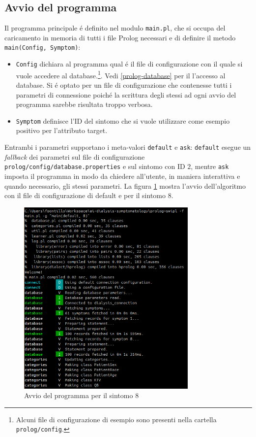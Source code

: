 \documentclass[preprint]{acm_proc_article-sp}
\begin{document}
\subsection{Avvio del programma}
\label{prolog-main}
Il programma principale \'e definito nel modulo \verb|main.pl|, che si occupa del caricamento in memoria di tutti i file Prolog necessari e di definire il metodo \verb|main(Config, Symptom)|:
\begin{itemize}
\item \verb|Config| dichiara al programma qual \'e il file di configurazione con il quale si vuole accedere al database.\footnote{Alcuni file di configurazione di esempio sono presenti nella cartella \texttt{prolog/config}.}. Vedi \ref{prolog-database} per il l'accesso al database. Si \'e optato per un file di configurazione che contenesse tutti i parametri di connessione poich\'e la scrittura degli stessi ad ogni avvio del programma sarebbe risultata troppo verbosa.
\item \verb|Symptom| definisce l'ID del sintomo che si vuole utilizzare come esempio positivo per l'attributo target.
\end{itemize}


Entrambi i parametri supportano i meta-valori \verb|default| e \verb|ask|: \verb|default| esegue un \textit{fallback} dei parametri sul file di configurazione \texttt{prolog/config/database.properties} e sul sintomo con ID $2$, mentre \verb|ask| imposta il programma in modo da chiedere all'utente, in maniera interattiva e quando necessario, gli stessi parametri. La figura \ref{fig:prolog-start} mostra l'avvio dell'algoritmo con il file di configurazione di default e per il sintomo $8$.

\begin{figure}[!htb]
\centering
\includegraphics[width=250pt]{figures/prolog-start.png}
\caption{Avvio del programma per il sintomo $8$}
\label{fig:prolog-start}
\end{figure}
\end{document}
